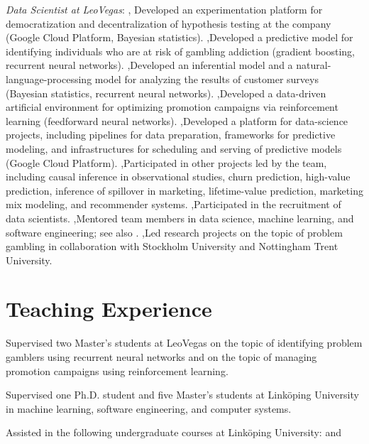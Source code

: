 \documentclass[journal]{IEEEtran}
\begin{document}
\date{February 2018--February 2022} \emph{Data Scientist at LeoVegas}: \sep
Developed an experimentation platform for democratization and decentralization
of hypothesis testing at the company (Google Cloud Platform, Bayesian
statistics). \sep Developed a predictive model for identifying individuals who
are at risk of gambling addiction (gradient boosting, recurrent neural
networks). \sep Developed an inferential model and a natural-language-processing
model for analyzing the results of customer surveys (Bayesian statistics,
recurrent neural networks). \sep Developed a data-driven artificial environment
for optimizing promotion campaigns via reinforcement learning (feedforward
neural networks). \sep Developed a platform for data-science projects, including
pipelines for data preparation, frameworks for predictive modeling, and
infrastructures for scheduling and serving of predictive models (Google Cloud
Platform). \sep Participated in other projects led by the team, including causal
inference in observational studies, churn prediction, high-value prediction,
inference of spillover in marketing, lifetime-value prediction, marketing mix
modeling, and recommender systems. \sep Participated in the recruitment of data
scientists. \sep Mentored team members in data science, machine learning, and
software engineering; see also . \sep Led research
projects on the topic of problem gambling in collaboration with Stockholm
University and Nottingham Trent University.

\section{Teaching Experience} 

\date{2018--2019} Supervised two Master's students at LeoVegas on the topic of
identifying problem gamblers using recurrent neural networks and on the topic of
managing promotion campaigns using reinforcement learning.

\date{2011--2017} Supervised one Ph.D. student and five Master's students at
Linköping University in machine learning, software engineering, and computer
systems.

\date{2011--2017} Assisted in the following undergraduate courses at Linköping
University:  
 and
\end{document}
